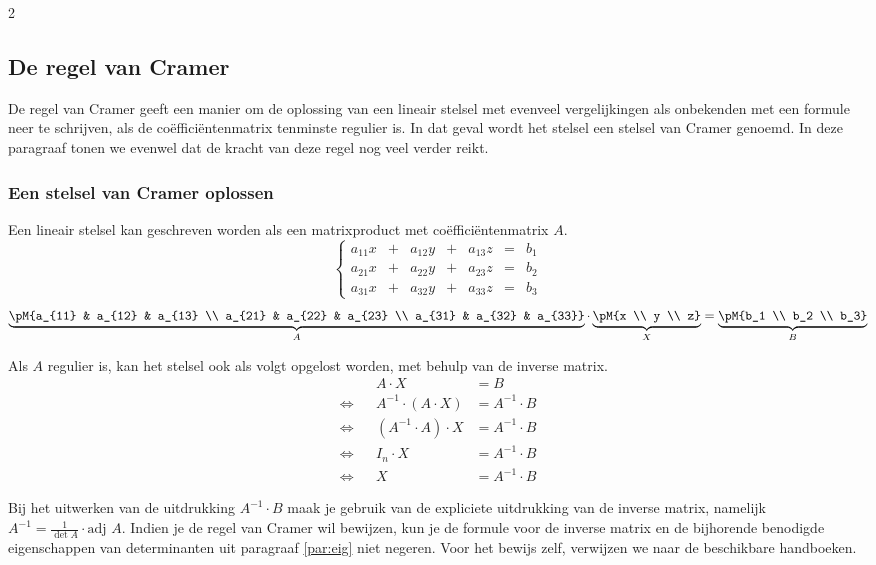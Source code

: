  \begin{multicols}{2}
     
 
 \subsection{De regel van Cramer}

De regel van Cramer geeft een manier om de oplossing van een lineair stelsel met evenveel vergelijkingen als onbekenden  met een formule neer te schrijven, als de co\"effici\"entenmatrix tenminste regulier is. In dat geval wordt het stelsel een stelsel van Cramer genoemd. In deze paragraaf tonen we evenwel dat de kracht van deze regel nog veel verder reikt. 
\subsubsection{Een stelsel van Cramer oplossen}
Een lineair stelsel kan geschreven worden als een matrixproduct met co\"effici\"entenmatrix $A$. 
$$\left\{ \begin{array}{ccccccc} 
        a_{11} x & +  & a_{12} y & + & a_{13} z & = &  b_1 \\
        a_{21} x & +  & a_{22} y & + & a_{23} z & = &  b_2 \\
        a_{31} x & +  & a_{32} y & + & a_{33} z & = &  b_3 
        \end{array} \right.  $$
      $$\underbrace{\pM{a_{11} & a_{12} & a_{13} \\ a_{21} & a_{22} & a_{23} \\ a_{31} & a_{32} & a_{33}}}_A \cdot \underbrace{\pM{x \\ y \\ z}}_X = \underbrace{\pM{b_1 \\ b_2 \\ b_3}}_B$$
      
      Als $A$ regulier is, kan het stelsel ook als volgt opgelost worden, met behulp van de inverse matrix.
%
\begin{align*}
    & & A\cdot X & = B \\
    \Leftrightarrow  & & A^{-1} \cdot (A\cdot X) & = A^{-1}\cdot B \\
    \Leftrightarrow  & & (A^{-1} \cdot A) \cdot X & = A^{-1}\cdot B \\
    \Leftrightarrow  & & I_n \cdot X & = A^{-1}\cdot B \\
    \Leftrightarrow  & &  X & = A^{-1}\cdot B
\end{align*}

Bij het uitwerken van de uitdrukking $A^{-1} \cdot B$ maak je gebruik van de expliciete uitdrukking van de inverse matrix, namelijk $A^{-1} = \frac{1}{\det A} \cdot \text{adj }A$. Indien je de regel van Cramer wil bewijzen, kun je de formule voor de inverse matrix en de bijhorende benodigde eigenschappen van determinanten uit paragraaf \ref{par:eig} niet negeren. Voor het bewijs zelf, verwijzen we naar de beschikbare handboeken. 
\end{multicols}

